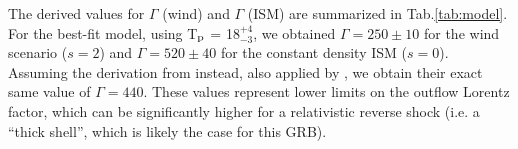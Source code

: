 \documentclass[preprint]{aastex631}
\begin{document}
The derived values for $\Gamma$ (wind) and $\Gamma$ (ISM) are summarized in Tab.\ref{tab:model}. For the best-fit model, using T$_{\rm p}$ = 18$^{+4}_{-3}$, we obtained $\Gamma = 250 \pm 10$ for the wind scenario ($s=2$) and $\Gamma = 520 \pm 40$ for the constant density ISM ($s=0$). 
Assuming the derivation from \citet{SP99} instead, also applied by \citet{BOAT_LHAASO}, we obtain their exact same value of $\Gamma  = 440$.
These values represent lower limits on the outflow Lorentz factor, which can be significantly higher for a relativistic reverse shock (i.e. a ``thick shell'', which is likely the case for this GRB).

\end{document}
